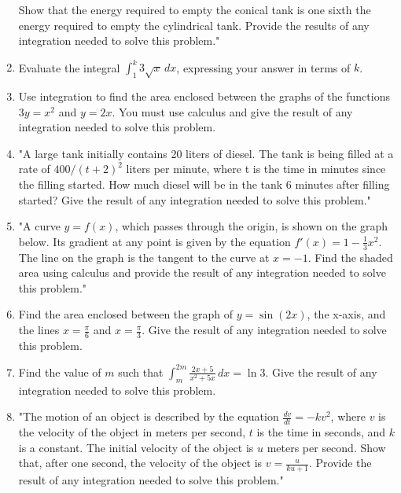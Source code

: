 \documentclass{article}
\begin{document}
\begin{enumerate}
Show that the energy required to empty the conical tank is one sixth the energy required to empty the cylindrical tank. Provide the results of any integration needed to solve this problem."
\vspace{3cm}
\item Evaluate the integral \(\int_{1}^{k} 3\sqrt{x} \, dx\), expressing your answer in terms of \(k\).
\vspace{3cm}
\item Use integration to find the area enclosed between the graphs of the functions \(3y = x^2\) and \(y = 2x\). You must use calculus and give the result of any integration needed to solve this problem.
\vspace{3cm}
\item "A large tank initially contains 20 liters of diesel. The tank is being filled at a rate of \(400/(t+2)^2\) liters per minute, where t is the time in minutes since the filling started. How much diesel will be in the tank 6 minutes after filling started? Give the result of any integration needed to solve this problem."
\vspace{3cm}
\item "A curve \( y = f(x) \), which passes through the origin, is shown on the graph below. Its gradient at any point is given by the equation \( f'(x) = 1 - \frac{1}{3}x^2 \). The line on the graph is the tangent to the curve at \( x = -1 \). Find the shaded area using calculus and provide the result of any integration needed to solve this problem."
\vspace{3cm}
\item Find the area enclosed between the graph of \( y = \sin(2x) \), the x-axis, and the lines \( x = \frac{\pi}{6} \) and \( x = \frac{\pi}{3} \). Give the result of any integration needed to solve this problem.
\vspace{3cm}
\item Find the value of \( m \) such that \(\int_{m}^{2m} \frac{2x+5}{x^2+5x} \, dx = \ln 3\). Give the result of any integration needed to solve this problem.
\vspace{3cm}
\item "The motion of an object is described by the equation \( \frac{dv}{dt} = -kv^2 \), where \( v \) is the velocity of the object in meters per second, \( t \) is the time in seconds, and \( k \) is a constant. The initial velocity of the object is \( u \) meters per second. Show that, after one second, the velocity of the object is \( v = \frac{u}{ku + 1} \). Provide the result of any integration needed to solve this problem."

\end{enumerate}
\end{document}
